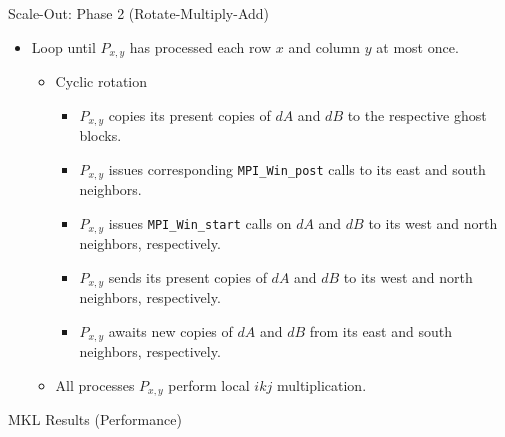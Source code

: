 \documentclass{beamer}
\begin{document}
\begin{frame}{Scale-Out: Phase 2 (Rotate-Multiply-Add)}
  \begin{itemize}
    \item{Loop until $P_{x,y}$ has processed each row $x$ and column $y$ at most once.}
      \begin{itemize}
      \item{Cyclic rotation}
        \begin{itemize}
        \item{$P_{x,y}$ copies its present copies of $dA$ and $dB$ to the respective ghost blocks.}
        \item{$P_{x,y}$ issues corresponding \texttt{MPI\_Win\_post} calls to its east and south neighbors.}
        \item{$P_{x,y}$ issues \texttt{MPI\_Win\_start} calls on $dA$ and $dB$ to its west and north neighbors, respectively.}
        \item{$P_{x,y}$ sends its present copies of $dA$ and $dB$ to its west and north neighbors, respectively.}
        \item{$P_{x,y}$ awaits new copies of $dA$ and $dB$ from its east and south neighbors, respectively.}
        \end{itemize}
      \item{All processes $P_{x,y}$ perform local $ikj$ multiplication.}
      \end{itemize}
  \end{itemize}
\end{frame}
\begin{frame}{MKL Results (Performance)}
\end{frame}
\end{document}
